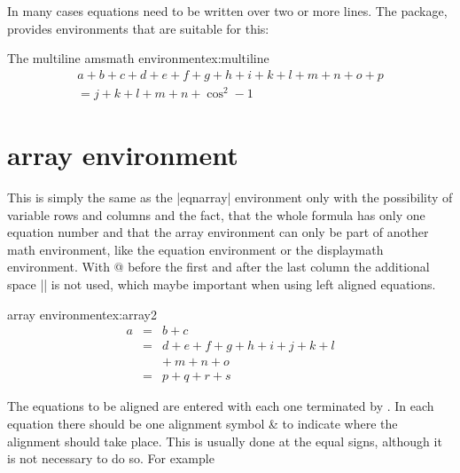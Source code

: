 In many cases equations need to be written over two or more lines. The  package, provides environments that are suitable for this:


\begin{texexample}{The multiline amsmath environment}{ex:multiline}
\begin{multline}
   a + b + c + d + e + f+ g + h + i  + k + l + m + n + o + p\\
              = j + k + l + m + n +\cos^{2}-1
\end{multline}
\end{texexample}



\newpage


\section{array environment}

This is simply the same as the |eqnarray| environment only with the possibility of
variable rows and columns and the fact, that the whole formula has only one
equation number and that the array environment can only be part of another math
environment, like the equation environment or the displaymath environment. With
@{} before the first and after the last column the additional space |\arraycolsep| is
not used, which maybe important when using left aligned equations.

\begin{texexample}{array environment}{ex:array2}
\begin{eqnarray}
  a & = & b + c \\
    & = & d + e + f + g + h + i
               + j + k + l \nonumber \\
    && +\: m + n + o \\
   & = & p + q + r + s
\end{eqnarray}
\end{texexample}

The equations
to be aligned are entered with each one terminated by \doccmd{\cr}. In each equation there should be
one alignment symbol \& to indicate where the alignment should take place. This is usually
done at the equal signs, although it is not necessary to do so. For example


